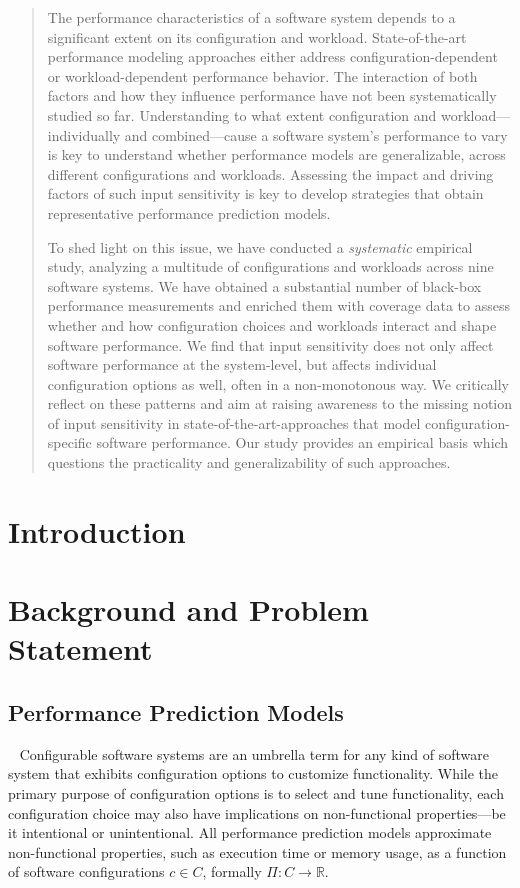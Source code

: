\begin{abstract}
	The performance characteristics of a software system depends to a significant extent on its configuration and workload. State-of-the-art performance modeling approaches either address configuration-dependent or workload-dependent performance behavior.  The interaction of both factors and how they influence performance have not been systematically studied so far. Understanding to what extent configuration and workload---individually and combined---cause a software system’s performance to vary is key to understand whether performance models are generalizable, across different configurations and workloads. Assessing the impact and driving factors of such input sensitivity is key to develop strategies that obtain representative performance prediction models.
	
	To shed light on this issue, we have conducted a \emph{systematic} empirical study, analyzing a multitude of configurations and workloads across {\color{red}nine} software systems. We have obtained a substantial number of black-box performance measurements and enriched them with coverage data to assess whether and how configuration choices and workloads interact and shape software performance. 
	{\color{edited}We find that input sensitivity does not only affect software performance at the system-level, but affects individual configuration options as well, often in a non-monotonous way. We critically reflect on these patterns and aim at raising awareness to the missing notion of input sensitivity in state-of-the-art-approaches that model configuration-specific software performance. Our study provides an empirical basis which questions the practicality and generalizability of such approaches.}
\end{abstract}

\section{Introduction}


\section{Background and Problem Statement}
\subsection{Performance Prediction Models}~\label{sec:perfmodels}
Configurable software systems are an umbrella term for any kind of software system that exhibits configuration options to customize functionality. While the primary purpose of configuration options is to select and tune functionality, each configuration choice may also have implications on non-functional properties---be it intentional or unintentional. 
All performance prediction models approximate non-functional properties, such as execution time or memory usage, as a function of software configurations $c \in C$, formally $\Pi: C \rightarrow \mathbb{R}$. 

